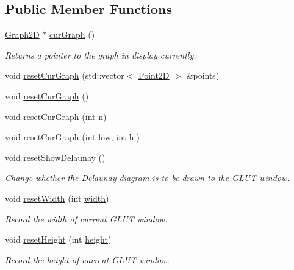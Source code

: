 \subsection*{Public Member Functions}
\begin{DoxyCompactItemize}
\item 
\hyperlink{classcmst_1_1_graph2_d}{Graph2D} $\ast$ \hyperlink{classcmst_1_1_window_a83548b1c4406f37a812a0920fc4d6669}{cur\+Graph} ()
\begin{DoxyCompactList}\small\item\em Returns a pointer to the graph in display currently. \end{DoxyCompactList}\item 
void \hyperlink{classcmst_1_1_window_adfa83ea52f2c09def65b79cdf57092ad}{reset\+Cur\+Graph} (std\+::vector$<$ \hyperlink{classcmst_1_1_point2_d}{Point2D} $>$ \&points)
\item 
void \hyperlink{classcmst_1_1_window_a08365866ac2ffa9793c25c92750341e2}{reset\+Cur\+Graph} ()
\item 
void \hyperlink{classcmst_1_1_window_a83743944c1c6429f0eb9f3c72c9b7f22}{reset\+Cur\+Graph} (int n)
\item 
void \hyperlink{classcmst_1_1_window_aa4ad17303edd88d526b66f9e6918fe7a}{reset\+Cur\+Graph} (int low, int hi)
\item 
void \hyperlink{classcmst_1_1_window_ae54c419d28bd352f52a3beffa6fc1f32}{reset\+Show\+Delaunay} ()
\begin{DoxyCompactList}\small\item\em Change whether the \hyperlink{class_delaunay}{Delaunay} diagram is to be drawn to the G\+L\+UT window. \end{DoxyCompactList}\item 
void \hyperlink{classcmst_1_1_window_a3f234daf3198e3611892515f1721de44}{reset\+Width} (int \hyperlink{classcmst_1_1_window_a5fc4ccbd9afed56cd17d341269028da2}{width})
\begin{DoxyCompactList}\small\item\em Record the width of current G\+L\+UT window. \end{DoxyCompactList}\item 
void \hyperlink{classcmst_1_1_window_a8c4d7788d1932e73397c20b7a9639d69}{reset\+Height} (int \hyperlink{classcmst_1_1_window_a6fc02b2afee52c0f71b6a3bd39c9210f}{height})
\begin{DoxyCompactList}\small\item\em Record the height of current G\+L\+UT window. \end{DoxyCompactList}\item 

\end{DoxyCompactItemize}
